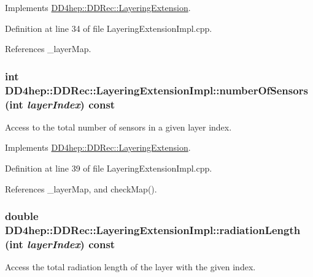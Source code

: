 Implements \hyperlink{class_d_d4hep_1_1_d_d_rec_1_1_layering_extension_a2a0ee0e2bdb875de6573591e2648e446}{DD4hep::DDRec::LayeringExtension}.

Definition at line 34 of file LayeringExtensionImpl.cpp.

References \_\-layerMap.\hypertarget{class_d_d4hep_1_1_d_d_rec_1_1_layering_extension_impl_a1cc4193b9f53354254635eed6e3f11ce}{
\subsubsection[{numberOfSensors}]{\setlength{\rightskip}{0pt plus 5cm}int DD4hep::DDRec::LayeringExtensionImpl::numberOfSensors (int {\em layerIndex}) const}}
\label{class_d_d4hep_1_1_d_d_rec_1_1_layering_extension_impl_a1cc4193b9f53354254635eed6e3f11ce}


Access to the total number of sensors in a given layer index. 

Implements \hyperlink{class_d_d4hep_1_1_d_d_rec_1_1_layering_extension_a91d00c26112a0456117d1036db335e5d}{DD4hep::DDRec::LayeringExtension}.

Definition at line 39 of file LayeringExtensionImpl.cpp.

References \_\-layerMap, and checkMap().\hypertarget{class_d_d4hep_1_1_d_d_rec_1_1_layering_extension_impl_a49155c5d57fdeed6553f7f9f7d492b6c}{
\subsubsection[{radiationLength}]{\setlength{\rightskip}{0pt plus 5cm}double DD4hep::DDRec::LayeringExtensionImpl::radiationLength (int {\em layerIndex}) const}}
\label{class_d_d4hep_1_1_d_d_rec_1_1_layering_extension_impl_a49155c5d57fdeed6553f7f9f7d492b6c}


Access the total radiation length of the layer with the given index. 

